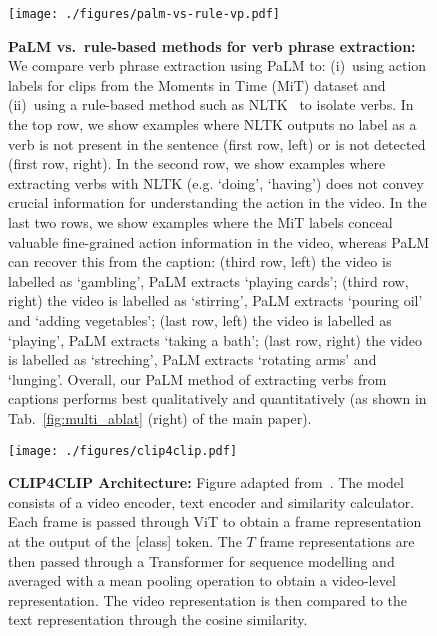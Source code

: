 \begin{figure}[H]
    \centering
    \texttt{[image: ./figures/palm-vs-rule-vp.pdf]}
    \caption{\textbf{PaLM vs.~rule-based methods for verb phrase extraction:} We compare verb phrase extraction using PaLM to:
(i)~using action labels for clips from the Moments in Time (MiT) dataset and (ii)~using a rule-based method such as NLTK~\cite{bird2009natural} to isolate verbs. In the top row, we show examples where NLTK outputs no label as a verb is not present in the sentence (first row, left) or is not detected (first row, right). In the second row, we show examples where extracting verbs with NLTK (e.g. `doing', `having') does not convey crucial information for understanding the action in the video. In the last two rows, we show examples where the MiT labels conceal valuable fine-grained action information in the video, whereas PaLM can recover this from the caption: (third row, left) the video is labelled as `gambling', PaLM extracts `playing cards'; (third row, right) the video is labelled as `stirring', PaLM extracts `pouring oil' and `adding vegetables'; (last row, left) the video is labelled as `playing', PaLM extracts `taking a bath'; (last row, right) the video is labelled as `streching', PaLM extracts `rotating arms' and `lunging'. Overall, our PaLM method of extracting verbs from captions performs best qualitatively and quantitatively (as shown in Tab.~\ref{fig:multi_ablat} (right) of the main paper).}
    \label{fig:palm-vs-rule-vp}
\end{figure} 


 



\begin{figure*}[ht!]
    \centering
    \texttt{[image: ./figures/clip4clip.pdf]}
    \caption{\textbf{CLIP4CLIP Architecture:} Figure adapted from~\cite{Luo2021CLIP4Clip}. The model consists of a video encoder, text encoder and similarity calculator. Each frame is passed through ViT to obtain a frame representation at the output of the [class] token. The $T$ frame representations are then passed through a Transformer for sequence modelling and averaged with a mean pooling operation to obtain a video-level representation. The video representation is then compared to the text representation through the cosine similarity. }
    \label{fig:qualitative}
\end{figure*}




